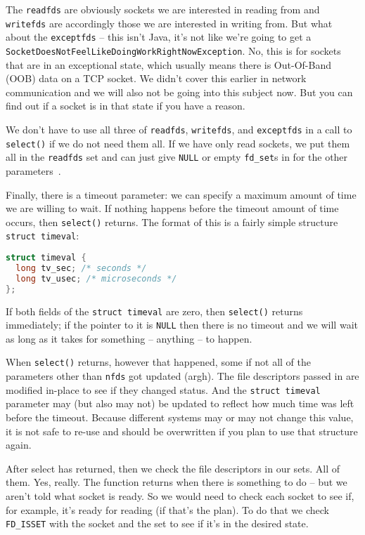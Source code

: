 The \texttt{readfds} are obviously sockets we are interested in reading from and \texttt{writefds} are accordingly those we are interested in writing from. But what about the \texttt{exceptfds} -- this isn't Java, it's not like we're going to get a \texttt{SocketDoesNotFeelLikeDoingWorkRightNowException}. No, this is for sockets that are in an exceptional state, which usually means there is Out-Of-Band (OOB) data on a TCP socket. We didn't cover this earlier in network communication and we will also not be going into this subject now. But you can find out if a socket is in that state if you have a reason.

We don't have to use all three of \texttt{readfds}, \texttt{writefds}, and \texttt{exceptfds} in a call to \texttt{select()} if we do not need them all. If we have only read sockets, we put them all in the \texttt{readfds} set and can just give \texttt{NULL} or empty \texttt{fd\_set}s in for the other parameters~\cite{getaddrinfo}.

Finally, there is a timeout parameter: we can specify a maximum amount of time we  are willing to wait. If nothing happens before the timeout amount of time occurs, then \texttt{select()} returns. The format of this is a fairly simple structure \texttt{struct timeval}:

\begin{lstlisting}[language=C]
struct timeval {
  long tv_sec; /* seconds */
  long tv_usec; /* microseconds */
};
\end{lstlisting}

If both fields of the \texttt{struct timeval} are zero, then \texttt{select()} returns immediately; if the pointer to it is \texttt{NULL} then there is no timeout and we will wait as long as it takes for something -- anything -- to happen.

When \texttt{select()} returns, however that happened, some if not all of the parameters other than \texttt{nfds} got updated (argh). The file descriptors passed in are modified in-place to see if they changed status.  And the \texttt{struct timeval} parameter may (but also may not) be updated to reflect how much time was left before the timeout. Because different systems may or may not change this value, it is not safe to re-use and should be overwritten if you plan to use that structure again.

After select has returned, then we check the file descriptors in our sets. All of them. Yes, really. The function returns when there is something to do -- but we aren't told what socket is ready. So we would need to check each socket to see if, for example, it's ready for reading (if that's the plan). To do that we check \texttt{FD\_ISSET} with the socket and the set to see if it's in the desired state.

